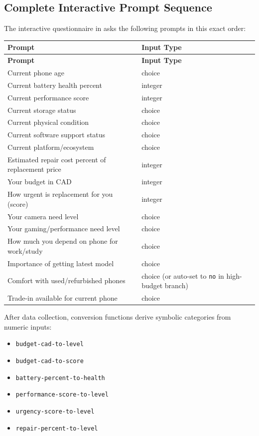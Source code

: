 \documentclass[11pt]{article}
\newcommand{\filepath}[1]{\path{#1}}
\begin{document}
\subsection{Complete Interactive Prompt Sequence}
The interactive questionnaire in \filepath{sample-scenarios.clp} asks the following prompts in this exact order:
\begin{longtable}{|L{0.55\textwidth}|L{0.38\textwidth}|}
\hline
{}
\textbf{Prompt} & \textbf{Input Type} \\ \hline
\hline
\endfirsthead
\hline
{}
\textbf{Prompt} & \textbf{Input Type} \\ \hline
\hline
\endhead
Current phone age & choice \\ \hline
Current battery health percent & integer \\ \hline
Current performance score & integer \\ \hline
Current storage status & choice \\ \hline
Current physical condition & choice \\ \hline
Current software support status & choice \\ \hline
Current platform/ecosystem & choice \\ \hline
Estimated repair cost percent of replacement price & integer \\ \hline
Your budget in CAD & integer \\ \hline
How urgent is replacement for you (score) & integer \\ \hline
Your camera need level & choice \\ \hline
Your gaming/performance need level & choice \\ \hline
How much you depend on phone for work/study & choice \\ \hline
Importance of getting latest model & choice \\ \hline
Comfort with used/refurbished phones & choice (or auto-set to \texttt{no} in high-budget branch) \\ \hline
Trade-in available for current phone & choice \\ \hline
\hline
\end{longtable}

After data collection, conversion functions derive symbolic categories from numeric inputs:
\begin{itemize}
  \item \texttt{budget-cad-to-level}
  \item \texttt{budget-cad-to-score}
  \item \texttt{battery-percent-to-health}
  \item \texttt{performance-score-to-level}
  \item \texttt{urgency-score-to-level}
  \item \texttt{repair-percent-to-level}
\end{itemize}
\end{document}
